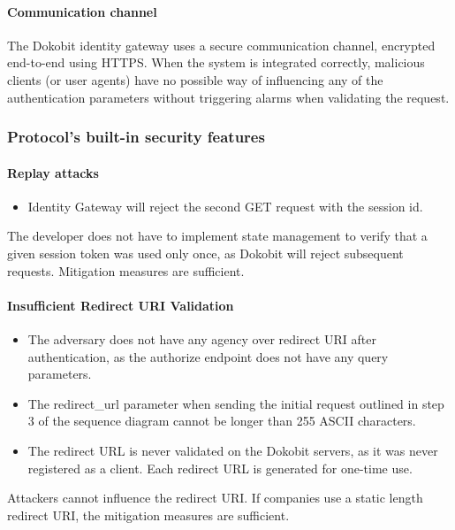 \paragraph{Communication channel}

The Dokobit identity gateway uses a secure communication channel, encrypted end-to-end using HTTPS. When the system is integrated correctly, malicious clients (or user agents) have no possible way of influencing any of the authentication parameters without triggering alarms when validating the request.

\subsubsection{Protocol's built-in security features}

\paragraph{Replay attacks}

\begin{itemize}
  \item Identity Gateway will reject the second GET request with the session id.
\end{itemize}

The developer does not have to implement state management to verify that a given session token was used only once, as Dokobit will reject subsequent requests. Mitigation measures are sufficient.

\paragraph{Insufficient Redirect URI Validation}

\begin{itemize}
  \item The adversary does not have any agency over redirect URI after authentication, as the {authorize} endpoint does not have any query parameters.
  \item The redirect\_url parameter when sending the initial request outlined in step 3 of the sequence diagram cannot be longer than 255 ASCII characters.
  \item The redirect URL is never validated on the Dokobit servers, as it was never registered as a client. Each redirect URL is generated for one-time use.
\end{itemize}

Attackers cannot influence the redirect URI. If companies use a static length redirect URI, the mitigation measures are sufficient.

